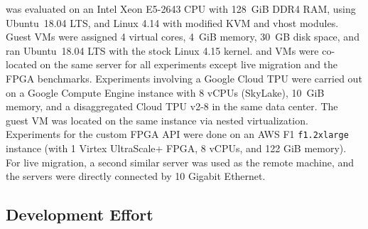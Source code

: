 \AvA was evaluated on an Intel Xeon E5-2643 CPU with 128~GiB DDR4 RAM, using
Ubuntu~18.04 LTS, and Linux 4.14 with modified KVM and vhost modules.
Guest VMs were assigned 4 virtual cores, 4~GiB memory, 30~GB disk space, and ran Ubuntu~18.04 LTS with the stock Linux 4.15 kernel.
\workers and VMs were co-located on the same server for all experiments except live migration and the FPGA benchmarks.
Experiments involving a Google Cloud TPU were carried out on a Google Compute Engine instance with 8 vCPUs (SkyLake), 10~GiB memory, and a disaggregated Cloud TPU v2-8 in the same data center.
The guest VM was located on the same instance via nested virtualization.
Experiments for the custom FPGA API were done on an AWS F1 \lstinline|f1.2xlarge| instance (with 1 Virtex UltraScale+ FPGA, 8 vCPUs, and 122 GiB memory).
For live migration, a second similar server was used as the remote machine, and the servers were directly connected by 10 Gigabit Ethernet.

\subsection{Development Effort}
\label{s:eval_effort}


